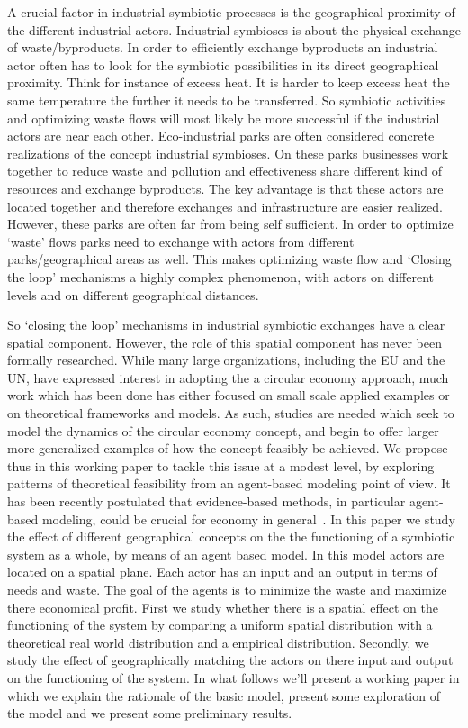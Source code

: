 \documentclass[fleqn,10pt]{wlscirep}
\begin{document}
A crucial factor in industrial symbiotic processes is the geographical proximity of the different industrial actors. Industrial symbioses is about the physical exchange of waste/byproducts. In order to efficiently exchange byproducts an industrial actor often has to look for the symbiotic possibilities in its direct geographical proximity. Think for instance of excess heat. It is harder to keep excess heat the same temperature the further it needs to be transferred. So symbiotic activities and optimizing waste flows will most likely be more successful if the industrial actors are near each other. Eco-industrial parks are often considered concrete realizations of the concept industrial symbioses. On these parks businesses work together to reduce waste and pollution and effectiveness share different kind of resources and exchange byproducts. The key advantage is that these actors are located together and therefore exchanges and infrastructure are easier realized. However, these parks are often far from being self sufficient. In order to optimize `waste' flows parks need to exchange with actors from different parks/geographical areas as well. This makes optimizing waste flow and `Closing the loop' mechanisms a highly complex phenomenon, with actors on different levels and on different geographical distances. 

So `closing the loop' mechanisms in industrial symbiotic exchanges have a clear spatial component. However, the role of this spatial component has never been formally researched. While many large organizations, including the EU and the UN,  have expressed interest in adopting the a circular economy approach, much work which has been done has either focused on small scale applied examples or on theoretical frameworks and models. As such, studies are needed which seek to model the dynamics of the circular economy concept, and begin to offer larger more generalized examples of how the concept feasibly be achieved. We propose thus in this working paper to tackle this issue at a modest level, by exploring patterns of theoretical feasibility from an agent-based modeling point of view. It has been recently postulated that evidence-based methods, in particular agent-based modeling, could be crucial for economy in general~\cite{farmer2009economy}. In this paper we study the effect of different geographical concepts on the the functioning of a symbiotic system as a whole, by means of an agent based model. In this model actors are located on a spatial plane. Each actor has an input and an output in terms of needs and waste. The goal of the agents is to minimize the waste and maximize there economical profit. First we study whether there is a spatial effect on the functioning of the system by comparing a uniform spatial distribution with a theoretical real world distribution and a empirical distribution. Secondly, we study the effect of geographically matching the actors on there input and output on the functioning of the system. In what follows we'll present a working paper in which we explain the rationale of the basic model, present some exploration of the model and we present some preliminary results.  
\end{document}
